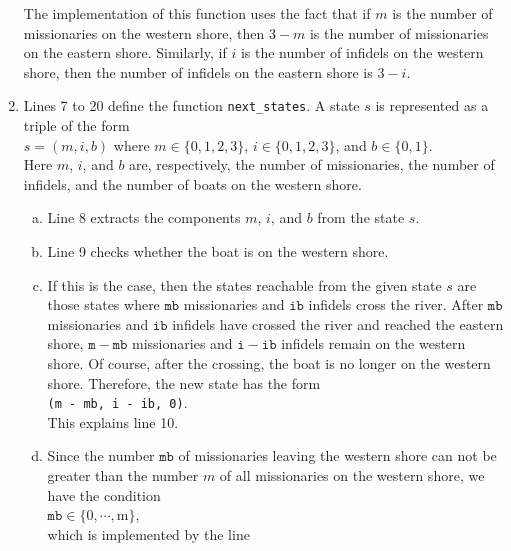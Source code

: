 \begin{enumerate}
      The implementation of this function uses the fact that if $m$ is the number of missionaries on
      the western shore, then $3-m$ is the number of missionaries on the eastern shore.  Similarly,
      if $i$ is the number of infidels on the western shore, then the number of infidels on the
      eastern shore is $3 - i$.
\item Lines 7 to 20 define the function \texttt{next\_states}.  A state $s$ is represented as a triple of
      the form
      \\[0.2cm]
      \hspace*{1.3cm}
      $s = (m, i, b)$ \quad where $m \in \{0,1,2,3\}$, $i \in \{0,1,2,3\}$, and $b \in\{0,1\}$.
      \\[0.2cm]
      Here $m$, $i$, and $b$ are, respectively, the number of missionaries, the number of infidels, and the number
      of boats on the western shore. 
      \begin{enumerate}[(a)]
      \item Line 8 extracts the components $m$, $i$, and $b$ from the state $s$.
      \item Line 9 checks whether the boat is on the western shore.
      \item If this is the case,  then the states reachable from the given state $s$ are those
            states where $\texttt{mb}$ missionaries and $\texttt{ib}$ infidels cross the river.
            After $\texttt{mb}$ missionaries and $\texttt{ib}$ infidels have crossed the river and
            reached the eastern shore, $\mathtt{m} - \mathtt{mb}$ missionaries and $\mathtt{i} - \mathtt{ib}$ infidels
            remain on the western shore.  Of course, after the crossing, the boat is no longer on the
            western shore.  Therefore, the new state has the form
            \\[0.2cm]
            \hspace*{1.3cm}
            \texttt{(m - mb, i - ib, 0)}.
            \\[0.2cm]
            This explains line 10.
      \item Since the number $\texttt{mb}$ of missionaries leaving the western shore can not be greater
            than the number $m$ of all missionaries on the western shore, we have the condition
            \\[0.2cm]
            \hspace*{1.3cm}
            $\mathtt{mb} \in \{0,\cdots,\mathrm{m}\}$,
            \\[0.2cm]
            which is implemented by the line

\end{enumerate}
\end{enumerate}
